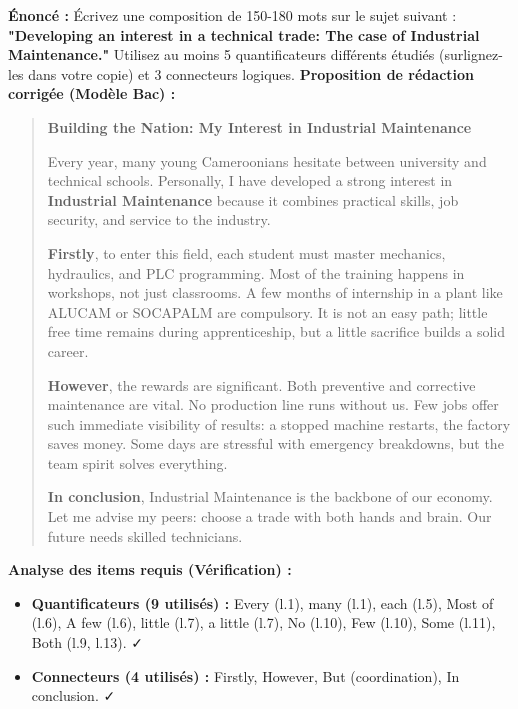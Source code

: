 \documentclass[11pt]{article}
\newcommand{\cle}[1]{{\popxbold\color{popdark}#1}}
\begin{document}
\begin{exoresolu}
    \textbf{Énoncé :} Écrivez une composition de 150-180 mots sur le sujet suivant : \textbf{"Developing an interest in a technical trade: The case of Industrial Maintenance."} Utilisez au moins 5 quantificateurs différents étudiés (surlignez-les dans votre copie) et 3 connecteurs logiques.
    \tcblower
    \textbf{Proposition de rédaction corrigée (Modèle Bac) :}
    \begin{quote}
        \textbf{Building the Nation: My Interest in Industrial Maintenance}
        \par
        \cle{Every} year, \cle{many} young Cameroonians hesitate between university and technical schools. Personally, I have developed a strong interest in \textbf{Industrial Maintenance} because it combines practical skills, job security, and service to the industry.
        \par
        \textbf{Firstly}, to enter this field, \cle{each} student must master mechanics, hydraulics, and PLC programming. \cle{Most of} the training happens in workshops, not just classrooms. \cle{A few} months of internship in a plant like ALUCAM or SOCAPALM are compulsory. It is \cle{not} an easy path; \cle{little} free time remains during apprenticeship, but \cle{a little} sacrifice builds a solid career.
        \par
        \textbf{However}, the rewards are significant. \cle{Both} preventive and corrective maintenance are vital. \cle{No} production line runs without us. \cle{Few} jobs offer such immediate visibility of results: a stopped machine restarts, the factory saves money. \cle{Some} days are stressful with emergency breakdowns, \cle{but} the team spirit solves everything.
        \par
        \textbf{In conclusion}, Industrial Maintenance is the backbone of our economy. \cle{Let me} advise my peers: choose a trade with \cle{both} hands and brain. \cle{Our} future needs skilled technicians.
    \end{quote}
    \textbf{Analyse des items requis (Vérification) :}
    \begin{itemize}
        \item \textbf{Quantificateurs (9 utilisés) :} \cle{Every} (l.1), \cle{many} (l.1), \cle{each} (l.5), \cle{Most of} (l.6), \cle{A few} (l.6), \cle{little} (l.7), \cle{a little} (l.7), \cle{No} (l.10), \cle{Few} (l.10), \cle{Some} (l.11), \cle{Both} (l.9, l.13). ✓
        \item \textbf{Connecteurs (4 utilisés) :} \cle{Firstly}, \cle{However}, \cle{But} (coordination), \cle{In conclusion}. ✓

\end{itemize}
\end{exoresolu}
\end{document}
